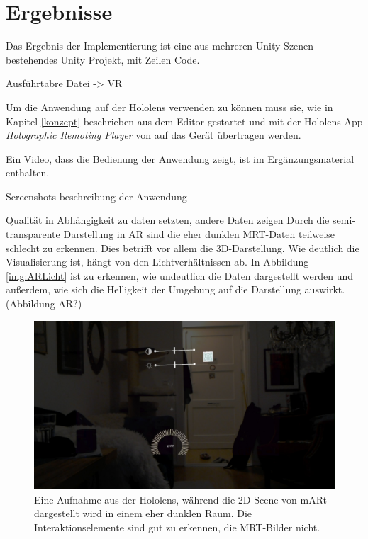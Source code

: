 

\chapter{Ergebnisse}
\label{ergebnisse}


Das Ergebnis der Implementierung ist eine aus mehreren Unity Szenen bestehendes Unity Projekt, mit  Zeilen Code. 

Ausführtabre Datei -> VR

Um die Anwendung auf der Hololens verwenden zu können muss sie, wie in Kapitel \ref{konzept} beschrieben aus dem Editor gestartet und mit der Hololens-App \textit{Holographic Remoting Player} von auf das Gerät übertragen werden. 



Ein Video, dass die Bedienung der Anwendung zeigt, ist im Ergänzungsmaterial enthalten.

Screenshots
beschreibung der Anwendung

Qualität in Abhängigkeit zu daten setzten, andere Daten zeigen
Durch die semi-transparente Darstellung in AR sind die eher dunklen MRT-Daten teilweise schlecht zu erkennen. Dies betrifft vor allem die 3D-Darstellung. Wie deutlich die Visualisierung ist, hängt von den Lichtverhältnissen ab. In Abbildung \ref{img:ARLicht} ist zu erkennen, wie undeutlich die Daten dargestellt werden und außerdem, wie sich die Helligkeit der Umgebung auf die Darstellung auswirkt. (Abbildung AR?)


\begin{figure}[!htb]
	\centering
	\includegraphics[width=0.5\linewidth]{images/hololens2D.jpg}
	\caption{Eine Aufnahme aus der Hololens, während die 2D-Scene von mARt dargestellt wird in einem eher dunklen Raum. Die Interaktionselemente sind gut zu erkennen, die MRT-Bilder nicht.}
	\label{img:mri}
\end{figure}
\FloatBarrier

